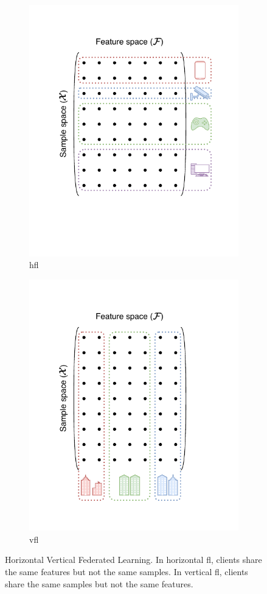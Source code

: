 \begin{figure}
  \centering
  \begin{subfigure}{.49\textwidth}
    \centering
    \includegraphics[width=.8\textwidth]{figures/horizontal}
    \caption{\acrfull{hfl}\label{fig:fl.horizontal}}
  \end{subfigure}
  \hfill
  \begin{subfigure}{.49\textwidth}
    \centering
    \includegraphics[width=.8\textwidth]{figures/vertical}
    \caption{\acrfull{vfl}\label{fig:fl.vertical}}
  \end{subfigure}
  \caption{
    Horizontal \vs Vertical Federated Learning.
    In horizontal \gls{fl}, clients share the same features but not the same samples.
    In vertical \gls{fl}, clients share the same samples but not the same features.
    \label{fig:fl.horizontal-vertical}
  }
\end{figure}

